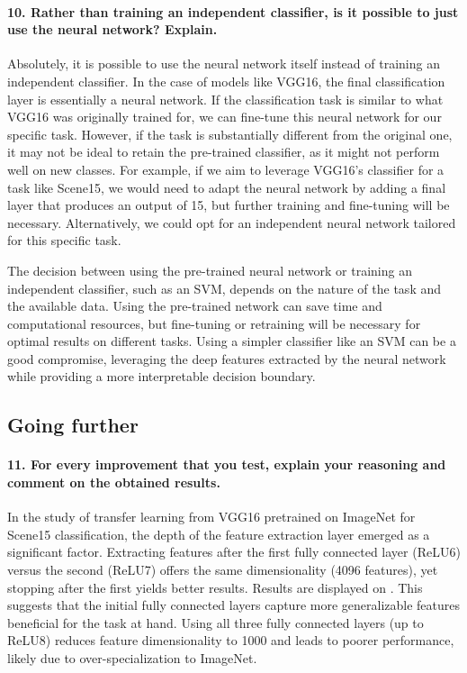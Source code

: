 \paragraph{10. Rather than training an independent classifier, is it possible to just use the neural network? Explain.}
Absolutely, it is possible to use the neural network itself instead of training an independent classifier. In the case of models like VGG16, the final classification layer is essentially a neural network. If the classification task is similar to what VGG16 was originally trained for, we can fine-tune this neural network for our specific task. However, if the task is substantially different from the original one, it may not be ideal to retain the pre-trained classifier, as it might not perform well on new classes. For example, if we aim to leverage VGG16's classifier for a task like Scene15, we would need to adapt the neural network by adding a final layer that produces an output of 15, but further training and fine-tuning will be necessary. Alternatively, we could opt for an independent neural network tailored for this specific task.

The decision between using the pre-trained neural network or training an independent classifier, such as an SVM, depends on the nature of the task and the available data. Using the pre-trained network can save time and computational resources, but fine-tuning or retraining will be necessary for optimal results on different tasks. Using a simpler classifier like an SVM can be a good compromise, leveraging the deep features extracted by the neural network while providing a more interpretable decision boundary.


\subsection{Going further}
\paragraph*{11. For every improvement that you test, explain your reasoning and comment on the obtained results.}

In the study of transfer learning from VGG16 pretrained on ImageNet for Scene15 classification, the depth of the feature extraction layer emerged as a significant factor. Extracting features after the first fully connected layer (ReLU6) versus the second (ReLU7) offers the same dimensionality (4096 features), yet stopping after the first yields better results. Results are displayed on . This suggests that the initial fully connected layers capture more generalizable features beneficial for the task at hand. Using all three fully connected layers (up to ReLU8) reduces feature dimensionality to 1000 and leads to poorer performance, likely due to over-specialization to ImageNet.

